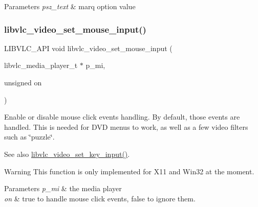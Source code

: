 \begin{DoxyParams}{Parameters}
{\em psz\+\_\+text} & marq option value \\
\hline
\end{DoxyParams}
\mbox{\label{group__libvlc__video_gad53def725dd5a50a3823b68ed31bca1a}} 
\subsubsection{\texorpdfstring{libvlc\+\_\+video\+\_\+set\+\_\+mouse\+\_\+input()}{libvlc\_video\_set\_mouse\_input()}}
{\footnotesize\ttfamily L\+I\+B\+V\+L\+C\+\_\+\+A\+PI void libvlc\+\_\+video\+\_\+set\+\_\+mouse\+\_\+input (\begin{DoxyParamCaption}\item[{libvlc\+\_\+media\+\_\+player\+\_\+t $\ast$}]{p\+\_\+mi,  }\item[{unsigned}]{on }\end{DoxyParamCaption})}

Enable or disable mouse click events handling. By default, those events are handled. This is needed for D\+VD menus to work, as well as a few video filters such as \char`\"{}puzzle\char`\"{}.

\begin{DoxySeeAlso}{See also}
\hyperlink{group__libvlc__video_ga8636dead7f51bd9fb7f82c17f3e46236}{libvlc\+\_\+video\+\_\+set\+\_\+key\+\_\+input()}.
\end{DoxySeeAlso}
\begin{DoxyWarning}{Warning}
This function is only implemented for X11 and Win32 at the moment.
\end{DoxyWarning}

\begin{DoxyParams}{Parameters}
{\em p\+\_\+mi} & the media player \\
\hline
{\em on} & true to handle mouse click events, false to ignore them. \\
\hline
\end{DoxyParams}
\mbox{\label{group__libvlc__video_ga36dfdf93272e1085d9183394c8aef1be}} 
